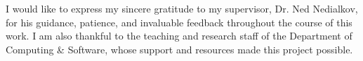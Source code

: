 
I would like to express my sincere gratitude to my supervisor, Dr. Ned
Nedialkov, for his guidance, patience, and invaluable feedback throughout the
course of this work. I am also thankful to the teaching and research staff of
the Department of Computing \& Software, whose support and resources made this
project possible.

